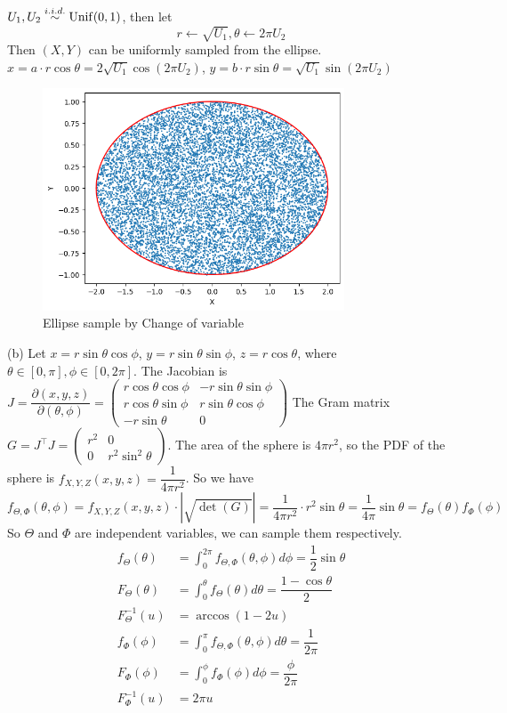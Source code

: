 \begin{homeworkProblem}
$U_1, U_2\stackrel{i.i.d.}{\sim} \operatorname{Unif}(0, 1)$, then let
$$r\leftarrow \sqrt{U_1}, \theta\leftarrow 2\pi U_2$$
Then $(X, Y)$ can be uniformly sampled from the ellipse.
$x = a\cdot r\cos\theta = 2\sqrt{U_1}\cos(2\pi U_2)$, $y = b\cdot r\sin\theta = \sqrt{U_1}\sin(2\pi U_2)$
\begin{figure}[h]
    \centering
    \includegraphics[width=0.8\textwidth]{./figure/p7/a_change_variable.png}
    \caption{Ellipse sample by Change of variable}
\end{figure}


(b) Let $x=r\sin\theta\cos\phi$, $y=r\sin\theta\sin\phi$, $z=r\cos\theta$, where $\theta\in [0, \pi], \phi\in [0, 2\pi]$. The Jacobian is $J=\dfrac{\partial(x, y, z)}{\partial(\theta, \phi)}=\begin{pmatrix}
r\cos\theta\cos\phi & -r\sin\theta\sin\phi \\
r\cos\theta\sin\phi & r\sin\theta\cos\phi \\
-r\sin\theta & 0
\end{pmatrix}$
The Gram matrix $G=J^{\top}J=\begin{pmatrix}
r^2 & 0 \\
0 & r^2\sin^2\theta
\end{pmatrix}$.
The area of the sphere is $4\pi r^2$, so the PDF of the sphere is $f_{X, Y, Z}(x, y, z)=\dfrac{1}{4\pi r^2}$.
So we have
$$f_{\Theta, \Phi}(\theta, \phi) = f_{X, Y, Z}(x, y, z)\cdot|\sqrt{\det(G)}|=\dfrac{1}{4\pi r^2}\cdot r^2\sin\theta = \dfrac{1}{4\pi}\sin\theta=f_{\Theta}(\theta)f_{\Phi}(\phi)$$
So $\Theta$ and $\Phi$ are independent variables, we can sample them respectively.
\begin{align*}
f_{\Theta}(\theta) &= \int_{0}^{2\pi}f_{\Theta, \Phi}(\theta, \phi)d\phi = \dfrac{1}{2}\sin\theta \\
F_{\Theta}(\theta) &= \int_{0}^{\theta}f_{\Theta}(\theta)d\theta = \dfrac{1-\cos\theta}{2} \\
F^{-1}_{\Theta}(u) &= \arccos(1-2u) \\
f_{\Phi}(\phi) &= \int_{0}^{\pi}f_{\Theta, \Phi}(\theta, \phi)d\theta = \dfrac{1}{2\pi} \\
F_{\Phi}(\phi) &= \int_{0}^{\phi}f_{\Phi}(\phi)d\phi = \dfrac{\phi}{2\pi} \\
F^{-1}_{\Phi}(u) &= 2\pi u
\end{align*}


\end{homeworkProblem}
